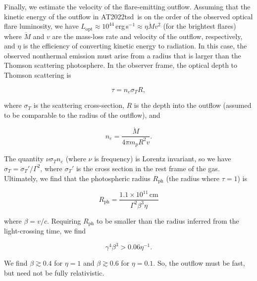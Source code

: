 \documentclass{nature_plusfigure}
\newcommand{\at}{AT2022tsd}
\begin{document}
\begin{methods}
Finally, we estimate the velocity of the flare-emitting outflow. Assuming that the kinetic energy of the outflow in \at\ is on the order of the observed optical flare luminosity, we have $L_\mathrm{opt} \approx 10^{44}\,$erg\,s$^{-1} \approx \eta \dot{M}v^2$ (for the brightest flares) where $\dot{M}$ and $v$ are the mass-loss rate and velocity of the outflow, respectively, and $\eta$ is the efficiency of converting kinetic energy to radiation. In this case, the observed nonthermal emission must arise from a radius that is larger than the Thomson scattering photosphere. In the observer frame, the optical depth to Thomson scattering is

\begin{equation}
\tau = n_e \sigma_T R,
\end{equation}

\noindent where $\sigma_T$ is the scattering cross-section, $R$ is the depth into the outflow (assumed to be comparable to the radius of the outflow), and

\begin{equation}
    n_e = \frac{\dot{M}}{4\pi m_p R^2 v}.
\end{equation}

\noindent The quantity $\nu \sigma_T n_e$ (where $\nu$ is frequency) is Lorentz invariant\cite{Rybicki1986}, so we have $\sigma_T = \sigma_T' / \Gamma^2$, where $\sigma_T'$ is the cross section in the rest frame of the gas. Ultimately, we find that the photospheric radius $R_\mathrm{ph}$ (the radius where $\tau=1$) is

\begin{equation}
    R_\mathrm{ph} = \frac{1.1 \times 10^{11}\,\mathrm{cm}}{ \Gamma^2 \beta^3 \eta}
\end{equation}

\noindent where $\beta=v/c$. Requiring $R_\mathrm{ph}$ to be smaller than the radius inferred from the light-crossing time, we find

\begin{equation}
    \gamma^4 \beta^3 > 0.06 \eta^{-1}.
\end{equation}

\noindent We find $\beta \gtrsim 0.4$ for $\eta=1$ and $\beta \gtrsim 0.6$ for $\eta=0.1$. So, the outflow must be fast, but need not be fully relativistic.


\end{methods}
\end{document}
